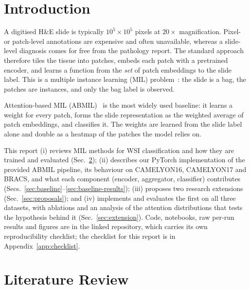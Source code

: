 \documentclass[conference]{IEEEtran}
\begin{document}
\section{Introduction}
A digitised H\&E slide is typically $10^5\times10^5$ pixels at $20\times$ magnification. Pixel- or patch-level annotations are expensive and often unavailable, whereas a slide-level diagnosis comes for free from the pathology report. The standard approach therefore tiles the tissue into patches, embeds each patch with a pretrained encoder, and learns a function from the \emph{set} of patch embeddings to the slide label. This is a multiple instance learning (MIL) problem~\cite{dietterich1997}: the slide is a bag, the patches are instances, and only the bag label is observed.

Attention-based MIL (ABMIL)~\cite{ilse2018} is the most widely used baseline: it learns a weight for every patch, forms the slide representation as the weighted average of patch embeddings, and classifies it. The weights are learned from the slide label alone and double as a heatmap of the patches the model relies on.

This report (i) reviews MIL methods for WSI classification and how they are trained and evaluated (Sec.~\ref{sec:lit}); (ii) describes our PyTorch implementation of the provided ABMIL pipeline, its behaviour on CAMELYON16, CAMELYON17 and BRACS, and what each component (encoder, aggregator, classifier) contributes (Secs.~\ref{sec:baseline}--\ref{sec:baseline-results}); (iii) proposes two research extensions (Sec.~\ref{sec:proposals}); and (iv) implements and evaluates the first on all three datasets, with ablations and an analysis of the attention distributions that tests the hypothesis behind it (Sec.~\ref{sec:extension}). Code, notebooks, raw per-run results and figures are in the linked repository, which carries its own reproducibility checklist; the checklist for this report is in Appendix~\ref{app:checklist}.

\section{Literature Review}\label{sec:lit}
\end{document}
